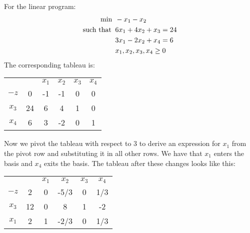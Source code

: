 \begin{example}
    For the linear program:
    \begin{align*}
        \min                      \:&\: -x_1-x_2          \\
        \textnormal{such that }     &\: 6x_1+4x_2+x_3=24  \\
                                    &\: 3x_1-2x_2+x_4=6  \\
                                    &\: x_1,x_2,x_3,x_4 \geq 0
    \end{align*}
    The corresponding tableau is: 
    \begin{table}[H]
        \centering
        \begin{tabular}{cccccc}
                                   &                         & $x_1$ & $x_2$ & $x_3$ & $x_4$                  \\ \cline{2-6} 
        \multicolumn{1}{c|}{$-z$}  & \multicolumn{1}{c|}{0}  & -1    & -1    & 0     & \multicolumn{1}{c|}{0} \\ \cline{2-6} 
        \multicolumn{1}{c|}{$x_3$} & \multicolumn{1}{c|}{24} & 6     & 4     & 1     & \multicolumn{1}{c|}{0} \\
        \multicolumn{1}{c|}{$x_4$} & \multicolumn{1}{c|}{6}  & 3     & -2    & 0     & \multicolumn{1}{c|}{1} \\ \cline{2-6} 
        \end{tabular}
    \end{table}
    Now we pivot the tableau with respect to 3 to derive an expression for $x_1$ from the pivot row and substituting it in all other rows.
    We have that $x_1$ enters the basis and $x_4$ exits the basis. 
    The tableau after these changes looks like this:
    \begin{table}[H]
        \centering
        \begin{tabular}{cccccc}
                                   &                         & $x_1$ & $x_2$ & $x_3$ & $x_4$                    \\ \cline{2-6} 
        \multicolumn{1}{c|}{$-z$}  & \multicolumn{1}{c|}{2}  & 0     & -5/3  & 0     & \multicolumn{1}{c|}{1/3} \\ \cline{2-6} 
        \multicolumn{1}{c|}{$x_3$} & \multicolumn{1}{c|}{12} & 0     & 8     & 1     & \multicolumn{1}{c|}{-2}  \\
        \multicolumn{1}{c|}{$x_1$} & \multicolumn{1}{c|}{2}  & 1     & -2/3  & 0     & \multicolumn{1}{c|}{1/3} \\ \cline{2-6} 
        \end{tabular}

\end{table}
\end{example}
